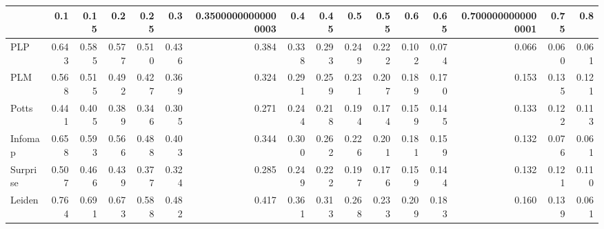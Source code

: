 \begin{tabular}{lrrrrrrrrrrrrrrr}
\toprule
{} &   0.1 &  0.15 &   0.2 &  0.25 &   0.3 & 0.35000000000000003 &   0.4 &  0.45 &   0.5 &  0.55 &   0.6 &  0.65 & 0.7000000000000001 &  0.75 &   0.8 \\
\midrule
PLP      & 0.643 & 0.585 & 0.577 & 0.510 & 0.436 &               0.384 & 0.338 & 0.293 & 0.249 & 0.222 & 0.102 & 0.074 &              0.066 & 0.060 & 0.061 \\
PLM      & 0.568 & 0.515 & 0.492 & 0.427 & 0.369 &               0.324 & 0.291 & 0.259 & 0.231 & 0.207 & 0.189 & 0.170 &              0.153 & 0.135 & 0.121 \\
Potts    & 0.441 & 0.405 & 0.389 & 0.346 & 0.305 &               0.271 & 0.244 & 0.218 & 0.194 & 0.174 & 0.159 & 0.145 &              0.133 & 0.122 & 0.113 \\
Infomap  & 0.658 & 0.593 & 0.566 & 0.488 & 0.403 &               0.344 & 0.300 & 0.262 & 0.226 & 0.201 & 0.181 & 0.159 &              0.132 & 0.076 & 0.061 \\
Surprise & 0.507 & 0.466 & 0.439 & 0.377 & 0.324 &               0.285 & 0.249 & 0.222 & 0.197 & 0.176 & 0.159 & 0.144 &              0.132 & 0.121 & 0.110 \\
Leiden   & 0.764 & 0.691 & 0.673 & 0.588 & 0.482 &               0.417 & 0.361 & 0.313 & 0.268 & 0.233 & 0.209 & 0.183 &              0.160 & 0.139 & 0.061 \\
\bottomrule
\end{tabular}
